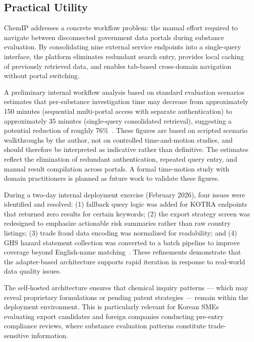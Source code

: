 \documentclass[preprint,12pt]{elsarticle}
\begin{document}
\subsection{Practical Utility}

ChemIP addresses a concrete workflow problem: the manual effort required to navigate between disconnected government data portals during substance evaluation. By consolidating nine external service endpoints into a single-query interface, the platform eliminates redundant search entry, provides local caching of previously retrieved data, and enables tab-based cross-domain navigation without portal switching.

A preliminary internal workflow analysis based on standard evaluation scenarios estimates that per-substance investigation time may decrease from approximately 150 minutes (sequential multi-portal access with separate authentication) to approximately 35 minutes (single-query consolidated retrieval), suggesting a potential reduction of roughly 76\%~\cite{kim2026playbook}. These figures are based on scripted scenario walkthroughs by the author, not on controlled time-and-motion studies, and should therefore be interpreted as indicative rather than definitive. The estimates reflect the elimination of redundant authentication, repeated query entry, and manual result compilation across portals. A formal time-motion study with domain practitioners is planned as future work to validate these figures.

During a two-day internal deployment exercise (February 2026), four issues were identified and resolved: (1) fallback query logic was added for KOTRA endpoints that returned zero results for certain keywords; (2) the export strategy screen was redesigned to emphasize actionable risk summaries rather than raw country listings; (3) trade fraud data encoding was normalized for readability; and (4) GHS hazard statement collection was converted to a batch pipeline to improve coverage beyond English-name matching~\cite{kim2026playbook}. These refinements demonstrate that the adapter-based architecture supports rapid iteration in response to real-world data quality issues.

The self-hosted architecture ensures that chemical inquiry patterns --- which may reveal proprietary formulations or pending patent strategies --- remain within the deployment environment. This is particularly relevant for Korean SMEs evaluating export candidates and foreign companies conducting pre-entry compliance reviews, where substance evaluation patterns constitute trade-sensitive information.
\end{document}
